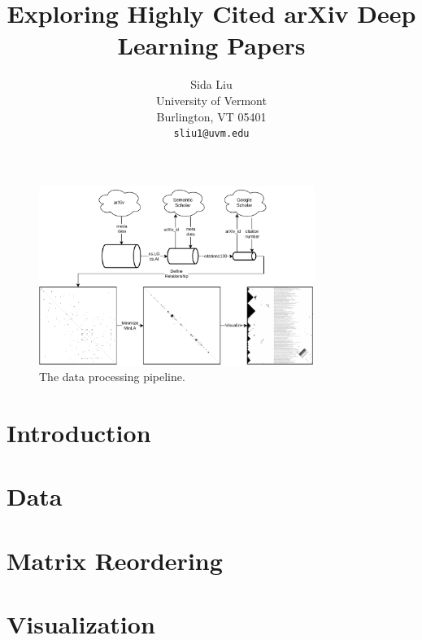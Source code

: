 \documentclass{article}
\title{Exploring Highly Cited arXiv Deep Learning Papers}
\author{
  Sida Liu \\
  University of Vermont\\
  Burlington, VT 05401\\
  \texttt{sliu1@uvm.edu} \\

}
\begin{document}
\maketitle

\begin{figure}[h]
  \centering
  \includegraphics[width=0.8\textwidth]{images/fig1_long.pdf}
  \caption{The data processing pipeline.}
  \label{fig:1}
\end{figure}

\begin{abstract}

\end{abstract}



% 

\section{Introduction}


\section{Data}


\section{Matrix Reordering}


\section{Visualization}

\end{document}
